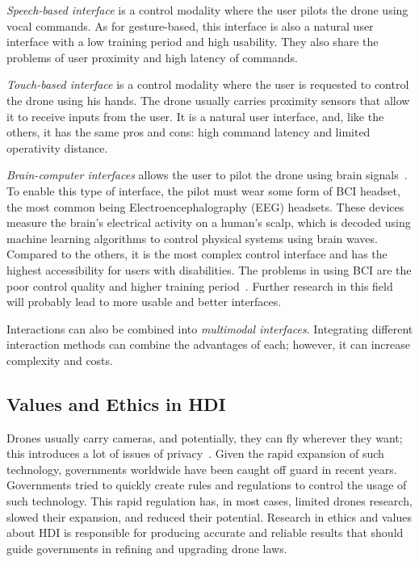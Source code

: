 \textit{Speech-based interface} is a control modality where the user pilots the drone using vocal commands. 
As for gesture-based, this interface is also a natural user interface with a low training period and high usability.
They also share the problems of user proximity and high latency of commands.  

\textit{Touch-based interface} is a control modality where the user is requested to control the drone using his hands. 
The drone usually carries proximity sensors that allow it to receive inputs from the user. 
It is a natural user interface, and, like the others, it has the same pros and cons: high command latency and limited operativity distance.

\textit{Brain-computer interfaces} allows the user to pilot the drone using brain signals~\cite{lafleur2013quadcopterBCI}.
To enable this type of interface, the pilot must wear some form of BCI headset, the most common being 
Electroencephalography (EEG) headsets. These devices measure the brain's electrical activity on a human's scalp, 
which is decoded using machine learning algorithms to control physical systems using brain waves. 
Compared to the others, it is the most complex control interface and has the highest accessibility for users with disabilities. 
The problems in using BCI are the poor control quality and higher training period~\cite{kawala2021summary}. 
Further research in this field will probably lead to more usable and better interfaces.

Interactions can also be combined into \textit{multimodal interfaces}. 
Integrating different interaction methods can combine the advantages of each; however, it can increase complexity and costs.

\subsection{Values and Ethics in HDI}\label{subsec:hdi_ethics}
Drones usually carry cameras, and potentially, they can fly wherever they want; this introduces a lot of issues of privacy~\cite{anderson2012accidentally}.
Given the rapid expansion of such technology, governments worldwide have been caught off guard in recent years. 
Governments tried to quickly create rules and regulations to control the usage of such technology. 
This rapid regulation has, in most cases, limited drones research, slowed their expansion, and reduced their potential.
Research in ethics and values about HDI is responsible for producing accurate and reliable results that should guide 
governments in refining and upgrading drone laws.



